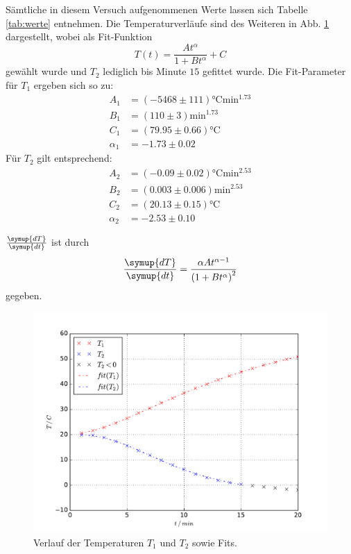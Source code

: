 Sämtliche in diesem Versuch aufgenommenen Werte lassen sich Tabelle \ref{tab:werte} entnehmen. Die Temperaturverläufe sind des Weiteren in Abb. \ref{fig:temp} dargestellt, wobei als Fit-Funktion
\begin{equation}
  T(t) = \frac{At^\alpha}{1+Bt^\alpha} +C
\end{equation}
gewählt wurde und $T_2$ lediglich bis Minute $15$ gefittet wurde.
Die Fit-Parameter für $T_1$ ergeben sich so zu:
\begin{align*}
  A_1 &= (-5468 \pm 111) \si{\celsius} \si{\minute}^{1.73} \\
  B_1 &= (110 \pm 3) \si{\minute}^{1.73} \\
  C_1 &= (79.95 \pm 0.66) \si{\celsius} \\
  \alpha_1 & = -1.73 \pm 0.02
\end{align*}
Für $T_2$ gilt entsprechend:
\begin{align*}
  A_2 &= (-0.09 \pm 0.02) \si{\celsius} \si{\minute}^{2.53} \\
  B_2 &= (0.003 \pm 0.006) \si{\minute}^{2.53} \\
  C_2 &= (20.13 \pm 0.15) \si{\celsius} \\
  \alpha_2 & = -2.53 \pm 0.10
\end{align*}

$\frac{\symup{dT}}{\symup{dt}}$ ist durch
\begin{equation}
  \frac{\symup{dT}}{\symup{dt}} = \frac{\alpha At^{\alpha-1}}{\left(1+Bt^\alpha \right)^2}
\end{equation}
gegeben.
\begin{figure}
  \centering
  \includegraphics[width = \textwidth]{./Plots/Temperaturverlauf.pdf}
  \caption{Verlauf der Temperaturen $T_1$ und $T_2$ sowie Fits.}
  \label{fig:temp}
\end{figure}
